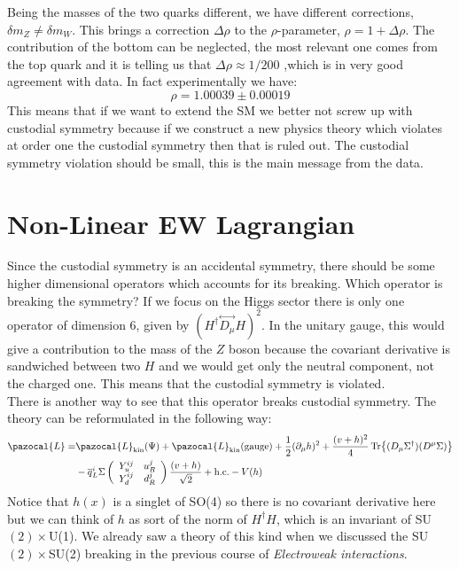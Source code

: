 \documentclass[../main.tex]{subfiles}
\begin{document}
Being the masses of the two quarks different, we have different corrections, $\delta m_Z\neq\delta m_W$. This brings a correction $\Delta\rho$ to the $\rho$-parameter, $\rho=1+\Delta\rho$. The contribution of the bottom can be neglected, the most relevant one comes from the top quark and it is telling us that $\Delta\rho\approx1/200$ ,which is in very good agreement with data. In fact experimentally we have:
\[
\rho=1.00039\pm0.00019
\]
This means that if we want to extend the SM we better not screw up with custodial symmetry because if we construct a new physics theory which violates at order one the custodial symmetry then that is ruled out. The custodial symmetry violation should be small, this is the main message from the data.
\section{Non-Linear EW Lagrangian}
Since the custodial symmetry is an accidental symmetry, there should be some higher dimensional operators which accounts for its breaking. Which operator is breaking the symmetry? If we focus on the Higgs sector there is only one operator of dimension 6, given by $(H^\dagger\overset{\leftrightarrow}{D_\mu}H)^2$. In the unitary gauge, this would give a contribution to the mass of the $Z$ boson because the covariant derivative is sandwiched between two $H$ and we would get only the neutral component, not the charged one. This means that the custodial symmetry is violated.\\
There is another way to see that this operator breaks custodial symmetry. The theory can be reformulated in the following way:
\begin{align*}
\pazocal{L}=&\pazocal{L}_{\text{kin}}(\Psi)+\pazocal{L}_{\text{kin}}(\text{gauge})+\frac{1}{2}(\partial_\mu h)^2+\frac{(v+h)^2}{4}\Tr{(D_\mu\Sigma^\dagger)(D^\mu\Sigma)}\\
&-\overline{q}_L^i\Sigma\left(\begin{array}{cc}
    Y_u^{ij} & u_R^j \\
    Y_d^{ij} & d_R^j
\end{array}\right)\frac{(v+h)}{\sqrt{2}}+\text{h.c.}-V(h)
\end{align*}
Notice that $h(x)$ is a singlet of SO(4) so there is no covariant derivative here but we can think of $h$ as sort of the norm of $H^\dagger H$, which is an invariant of SU$(2)\times$U(1). We already saw a theory of this kind when we discussed the SU$(2)\times$SU(2) breaking in the previous course of \textit{Electroweak interactions}.
\end{document}
